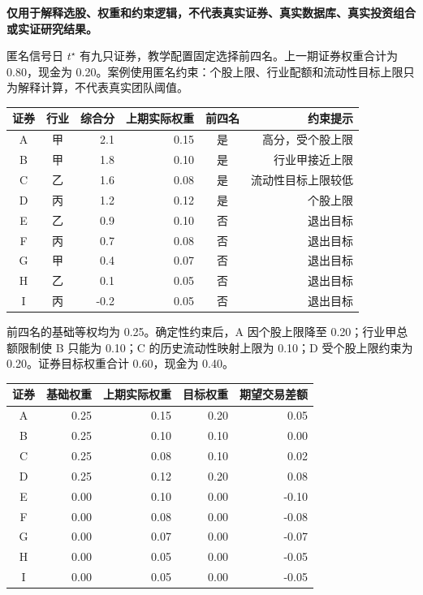 \begin{casebox}
\textbf{仅用于解释选股、权重和约束逻辑，不代表真实证券、真实数据库、真实投资组合或实证研究结果。}

匿名信号日 \(t^\star\) 有九只证券，教学配置固定选择前四名。上一期证券权重合计为 0.80，现金为 0.20。案例使用匿名约束：个股上限、行业配额和流动性目标上限只为解释计算，不代表真实团队阈值。

\begin{center}
\footnotesize
\begin{tabular}{c c r r c r}
  \toprule
  证券 & 行业 & 综合分 & 上期实际权重 & 前四名 & 约束提示 \\
  \midrule
  A & 甲 & 2.1 & 0.15 & 是 & 高分，受个股上限 \\
  B & 甲 & 1.8 & 0.10 & 是 & 行业甲接近上限 \\
  C & 乙 & 1.6 & 0.08 & 是 & 流动性目标上限较低 \\
  D & 丙 & 1.2 & 0.12 & 是 & 个股上限 \\
  E & 乙 & 0.9 & 0.10 & 否 & 退出目标 \\
  F & 丙 & 0.7 & 0.08 & 否 & 退出目标 \\
  G & 甲 & 0.4 & 0.07 & 否 & 退出目标 \\
  H & 乙 & 0.1 & 0.05 & 否 & 退出目标 \\
  I & 丙 & -0.2 & 0.05 & 否 & 退出目标 \\
  \bottomrule
\end{tabular}
\end{center}

前四名的基础等权均为 0.25。确定性约束后，A 因个股上限降至 0.20；行业甲总额限制使 B 只能为 0.10；C 的历史流动性映射上限为 0.10；D 受个股上限约束为 0.20。证券目标权重合计 0.60，现金为 0.40。

\begin{center}
\footnotesize
\begin{tabular}{c r r r r}
  \toprule
  证券 & 基础权重 & 上期实际权重 & 目标权重 & 期望交易差额 \\
  \midrule
  A & 0.25 & 0.15 & 0.20 & 0.05 \\
  B & 0.25 & 0.10 & 0.10 & 0.00 \\
  C & 0.25 & 0.08 & 0.10 & 0.02 \\
  D & 0.25 & 0.12 & 0.20 & 0.08 \\
  E & 0.00 & 0.10 & 0.00 & -0.10 \\
  F & 0.00 & 0.08 & 0.00 & -0.08 \\
  G & 0.00 & 0.07 & 0.00 & -0.07 \\
  H & 0.00 & 0.05 & 0.00 & -0.05 \\
  I & 0.00 & 0.05 & 0.00 & -0.05 \\
  \bottomrule
\end{tabular}
\end{center}
\end{casebox}

